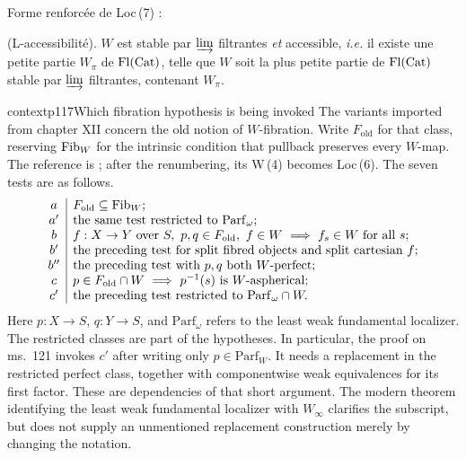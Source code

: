 Forme renforcée de Loc\,(7) :

\begin{description}[labelwidth=5.5em,leftmargin=6.5em,style=sameline]
\item[Loc\,(7\,bis)] (L-accessibilité). $W$ est stable par $\varinjlim$ filtrantes \textit{et} accessible, \textit{i.e.} il existe une petite partie $W_\pi$ de $\mathrm{Fl}(\mathrm{Cat})$, telle que $W$ soit la plus petite partie de $\mathrm{Fl}(\mathrm{Cat})$ stable par $\varinjlim$ filtrantes, contenant $W_\pi$.
\end{description}


\begin{dcomment}{context}{p117}{Which fibration hypothesis is being invoked}
The variants imported from chapter XII concern the old notion of $W$-fibration. Write $F_{\mathrm{old}}$ for that class, reserving $\mathrm{Fib}_W$ for the intrinsic condition that pullback preserves every $W$-map. The reference is \citet[ms.~53]{Grothendieck1990XIIa}; after the renumbering, its W\,(4) becomes Loc\,(6). The seven tests are as follows.
\[
\begin{array}{c|l}
 a&F_{\mathrm{old}}\subseteq\mathrm{Fib}_W;\\
 a'&\text{the same test restricted to }\mathrm{Parf}_{\omega};\\
 b&f:X\to Y\text{ over }S,\ p,q\in F_{\mathrm{old}},\ f\in W
       \ \Longrightarrow\ f_s\in W\text{ for all }s;\\
 b'&\text{the preceding test for split fibred objects and split cartesian }f;\\
 b''&\text{the preceding test with }p,q\text{ both }W\text{-perfect};\\
 c&p\in F_{\mathrm{old}}\cap W\ \Longrightarrow\ p^{-1}(s)\text{ is }W\text{-aspherical};\\
 c'&\text{the preceding test restricted to }\mathrm{Parf}_{\omega}\cap W.
\end{array}
\]
Here $p:X\to S$, $q:Y\to S$, and $\mathrm{Parf}_{\omega}$ refers to the least weak fundamental localizer. The restricted classes are part of the hypotheses. In particular, the proof on ms.~121 invokes $c'$ after writing only $p\in\mathrm{Parf}_W$. It needs a replacement in the restricted perfect class, together with componentwise weak equivalences for its first factor. These are dependencies of that short argument. The modern theorem identifying the least weak fundamental localizer with $W_\infty$ clarifies the subscript, but does not supply an unmentioned replacement construction merely by changing the notation.
\end{dcomment}


